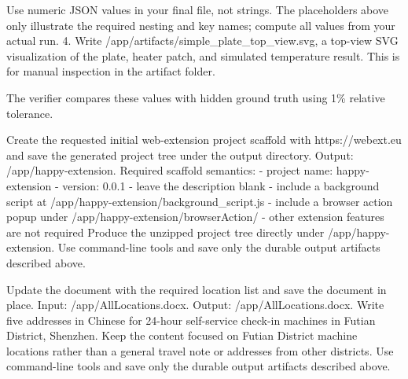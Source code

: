 \begin{instructionbox}
Use numeric JSON values in your final file, not strings. The placeholders above only illustrate the required nesting and key names; compute all values from your actual run.
4. Write \textasciigrave{}/app/artifacts/simple\_plate\_top\_view.svg\textasciigrave{}, a top-view SVG visualization of the plate, heater patch, and simulated temperature result. This is for manual inspection in the artifact folder.

The verifier compares these values with hidden ground truth using 1\% relative tolerance.
\end{instructionbox}

\begin{instructionbox}
Create the requested initial web-extension project scaffold with https://webext.eu and save the generated project tree under the output directory.
Output: \textasciigrave{}/app/happy-extension\textasciigrave{}.
Required scaffold semantics:
- project name: \textasciigrave{}happy-extension\textasciigrave{}
- version: \textasciigrave{}0.0.1\textasciigrave{}
- leave the description blank
- include a background script at \textasciigrave{}/app/happy-extension/background\_script.js\textasciigrave{}
- include a browser action popup under \textasciigrave{}/app/happy-extension/browserAction/\textasciigrave{}
- other extension features are not required
Produce the unzipped project tree directly under \textasciigrave{}/app/happy-extension\textasciigrave{}.
Use command-line tools and save only the durable output artifacts described above.
\end{instructionbox}

\begin{instructionbox}
Update the document with the required location list and save the document in place.
Input: \textasciigrave{}/app/AllLocations.docx\textasciigrave{}.
Output: \textasciigrave{}/app/AllLocations.docx\textasciigrave{}.
Write five addresses in Chinese for 24-hour self-service check-in machines in Futian District, Shenzhen. Keep the content focused on Futian District machine locations rather than a general travel note or addresses from other districts.
Use command-line tools and save only the durable output artifacts described above.
\end{instructionbox}

